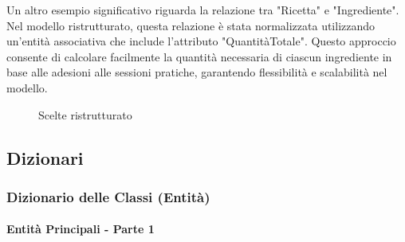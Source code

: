 Un altro esempio significativo riguarda la relazione tra "Ricetta" e "Ingrediente". Nel modello ristrutturato, questa relazione è stata normalizzata utilizzando un'entità associativa che include l'attributo "QuantitàTotale". Questo approccio consente di calcolare facilmente la quantità necessaria di ciascun ingrediente in base alle adesioni alle sessioni pratiche, garantendo flessibilità e scalabilità nel modello.
\begin{figure}[H]
    \noindent{}
    \caption{Scelte ristrutturato}
\end{figure}

\subsection{Dizionari}

\subsubsection{Dizionario delle Classi (Entità)}

\paragraph{Entità Principali - Parte 1}

